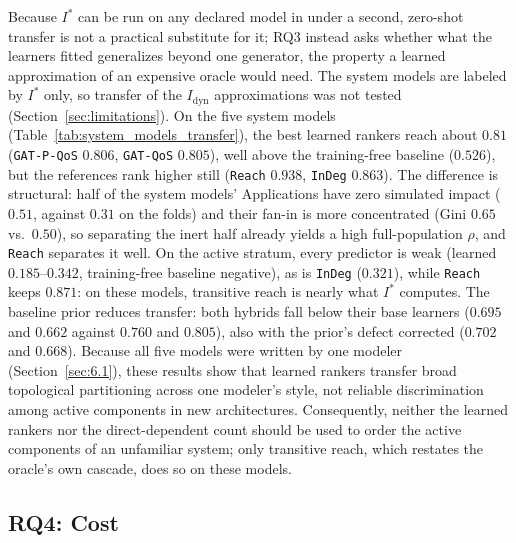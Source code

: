 \documentclass[preprint,3p]{elsarticle}
\begin{document}
Because $I^*$ can be run on any declared model in under a second, zero-shot transfer is not a practical substitute for it; RQ3 instead asks whether what the learners fitted generalizes beyond one generator, the property a learned approximation of an expensive oracle would need. The system models are labeled by $I^*$ only, so transfer of the $I_{\text{dyn}}$ approximations was not tested (Section~\ref{sec:limitations}). On the five system models (Table~\ref{tab:system_models_transfer}), the best learned rankers reach about $0.81$ (\texttt{GAT-P-QoS} $0.806$, \texttt{GAT-QoS} $0.805$), well above the training-free baseline ($0.526$), but the references rank higher still (\texttt{Reach} $0.938$, \texttt{InDeg} $0.863$). The difference is structural: half of the system models' Applications have zero simulated impact ($0.51$, against $0.31$ on the folds) and their fan-in is more concentrated (Gini $0.65$ vs.\ $0.50$), so separating the inert half already yields a high full-population $\rho$, and \texttt{Reach} separates it well. On the active stratum, every predictor is weak (learned $0.185$--$0.342$, training-free baseline negative), as is \texttt{InDeg} ($0.321$), while \texttt{Reach} keeps $0.871$: on these models, transitive reach is nearly what $I^*$ computes. The baseline prior reduces transfer: both hybrids fall below their base learners ($0.695$ and $0.662$ against $0.760$ and $0.805$), also with the prior's defect corrected ($0.702$ and $0.668$). Because all five models were written by one modeler (Section~\ref{sec:6.1}), these results show that learned rankers transfer broad topological partitioning across one modeler's style, not reliable discrimination among active components in new architectures. Consequently, neither the learned rankers nor the direct-dependent count should be used to order the active components of an unfamiliar system; only transitive reach, which restates the oracle's own cascade, does so on these models.

\subsection{RQ4: Cost}
\label{sec:rq4}
\end{document}
